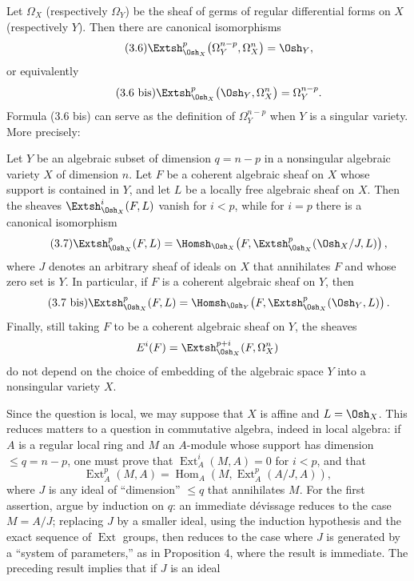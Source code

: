 Let $\Omega_X$ (respectively $\Omega_Y$) be the sheaf of germs of regular
differential forms on $X$ (respectively $Y$). Then there are canonical
isomorphisms
\begin{equation}\tag{3.6}
  \Extsh_{\Osh_X}^{p}\bigl(\Omega_Y^{n-p},\Omega_X^{n}\bigr)=\Osh_Y,
\end{equation}
or equivalently
\begin{equation}\tag{3.6 bis}
  \Extsh_{\Osh_X}^{p}\bigl(\Osh_Y,\Omega_X^{n}\bigr)=\Omega_Y^{n-p}.
\end{equation}
Formula (3.6 bis) can serve as the definition of $\Omega_Y^{n-p}$ when $Y$ is a
singular variety. More precisely:

 Let $Y$ be an algebraic subset of dimension $q=n-p$ in
a nonsingular algebraic variety $X$ of dimension $n$. Let $F$ be a coherent
algebraic sheaf on $X$ whose support is contained in $Y$, and let $L$ be a
locally free algebraic sheaf on $X$. Then the sheaves
$\Extsh_{\Osh_X}^{i}(F,L)$ vanish for $i<p$, while for $i=p$ there is a canonical
isomorphism
\begin{equation}\tag{3.7}
  \Extsh_{\Osh_X}^{p}(F,L)
  =\Homsh_{\Osh_X}\!\left(F,
  \Extsh_{\Osh_X}^{p}(\Osh_X/J,L)\right),
\end{equation}
where $J$ denotes an arbitrary sheaf of ideals on $X$ that annihilates $F$ and
whose zero set is $Y$. In particular, if $F$ is a coherent algebraic sheaf on
$Y$, then
\begin{equation}\tag{3.7 bis}
  \Extsh_{\Osh_X}^{p}(F,L)
  =\Homsh_{\Osh_Y}\!\left(F,\Extsh_{\Osh_X}^{p}(\Osh_Y,L)\right).
\end{equation}
Finally, still taking $F$ to be a coherent algebraic sheaf on $Y$, the sheaves
\[
  E^{i}(F)=\Extsh_{\Osh_X}^{p+i}(F,\Omega_X^{n})
\]
do not depend on the choice of embedding of the algebraic space $Y$ into a
nonsingular variety $X$.

Since the question is local, we may suppose that $X$ is affine and
$L=\Osh_X$. This reduces matters to a question in commutative algebra, indeed in
local algebra: if $A$ is a regular local ring and $M$ an $A$-module whose
support has dimension $\leq q=n-p$, one must prove that
$\operatorname{Ext}_{A}^{i}(M,A)=0$ for $i<p$, and that
\[
  \operatorname{Ext}_{A}^{p}(M,A)
  =\operatorname{Hom}_{A}\!\left(M,\operatorname{Ext}_{A}^{p}(A/J,A)\right),
\]
where $J$ is any ideal of “dimension” $\leq q$ that annihilates $M$. For the
first assertion, argue by induction on $q$: an immediate dévissage reduces to
the case $M=A/J$; replacing $J$ by a smaller ideal, using the induction
hypothesis and the exact sequence of $\operatorname{Ext}$ groups, then reduces
to the case where $J$ is generated by a “system of parameters,” as in
Proposition 4, where the result is immediate. The preceding result implies that
if $J$ is an ideal

